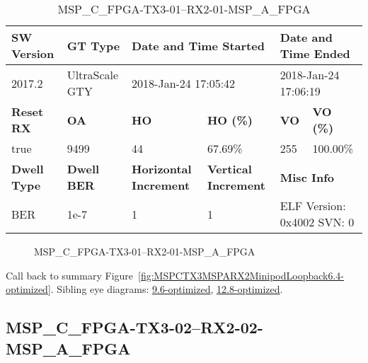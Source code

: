 \begin{table}[h]
\centering
\caption{MSP\_C\_FPGA-TX3-01--RX2-01-MSP\_A\_FPGA}
\label{tab:MSPCFPGATX301RX201MSPAFPGA6.4-optimized}
\begin{tabular}{@{}|l|l|l|l|l|l|@{}}
\toprule
\textbf{SW Version}                & \textbf{GT Type}   & \multicolumn{2}{l|}{\textbf{Date and Time Started}}            & \multicolumn{2}{l|}{\textbf{Date and Time Ended}}        \\ \midrule
2017.2                       & UltraScale GTY          & \multicolumn{2}{l|}{2018-Jan-24 17:05:42}                   & \multicolumn{2}{l|}{2018-Jan-24 17:06:19}               \\ \midrule
\textbf{Reset RX}                  & \textbf{OA} & \textbf{HO}   & \textbf{HO (\%)} & \textbf{VO} & \textbf{VO (\%)} \\ \midrule
true & 9499        & 44          & 67.69\%        & 255        & 100.00\%       \\ \midrule
\textbf{Dwell Type}                & \textbf{Dwell BER} & \textbf{Horizontal Increment} & \textbf{Vertical Increment}    & \multicolumn{2}{l|}{\textbf{Misc Info}}                  \\ \midrule
BER                            & 1e-7        & 1        & 1           & \multicolumn{2}{l|}{ELF Version: 0x4002 SVN: 0}                         \\ \bottomrule
\end{tabular}
\end{table}

\begin{figure}[h]
\caption{MSP\_C\_FPGA-TX3-01--RX2-01-MSP\_A\_FPGA} \label{fig:MSPCFPGATX301RX201MSPAFPGA6.4-optimized}
\end{figure}

Call back to summary Figure~\ref{fig:MSPCTX3MSPARX2MinipodLoopback6.4-optimized}.
Sibling eye diagrams: \hyperref[sec:MSPCFPGATX301RX201MSPAFPGA9.6-optimized]{9.6-optimized}, \hyperref[sec:MSPCFPGATX301RX201MSPAFPGA12.8-optimized]{12.8-optimized}.

\clearpage
\newpage


\subsection{MSP\_C\_FPGA-TX3-02--RX2-02-MSP\_A\_FPGA}\label{sec:MSPCFPGATX302RX202MSPAFPGA6.4-optimized}

